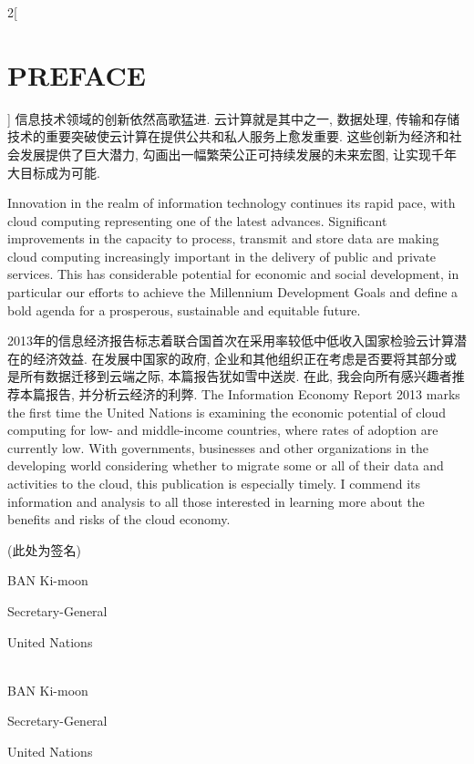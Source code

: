\documentclass[a4paper, UTF8, 12pt]{article}
\begin{document}
\begin{paracol}{2}[\section{PREFACE}]
    \switchcolumn*
    信息技术领域的创新依然高歌猛进. 云计算就是其中之一, 数据处理, 传输和存储技术的重要突破使云计算在提供公共和私人服务上愈发重要. 这些创新为经济和社会发展提供了巨大潜力, 勾画出一幅繁荣公正可持续发展的未来宏图, 让实现千年大目标成为可能. 

    \switchcolumn   
    Innovation in the realm of information technology continues its rapid pace, with cloud computing representing one of the latest advances. Significant improvements in the capacity to process, transmit and store data are making cloud computing increasingly important in the delivery of public and private services. This has considerable potential for economic and social development, in particular our efforts to achieve the Millennium Development Goals and define a bold agenda for a prosperous, sustainable and equitable future. 

    \switchcolumn*
    2013年的信息经济报告标志着联合国首次在采用率较低中低收入国家检验云计算潜在的经济效益. 在发展中国家的政府, 企业和其他组织正在考虑是否要将其部分或是所有数据迁移到云端之际, 本篇报告犹如雪中送炭. 在此, 我会向所有感兴趣者推荐本篇报告, 并分析云经济的利弊.
    \switchcolumn
    The Information Economy Report 2013 marks the first time the United Nations is examining the economic potential of cloud computing for low- and middle-income countries, where rates of adoption are currently low. With governments, businesses and other organizations in the developing world considering whether to migrate some or all of their data and activities to the cloud, this publication is especially timely. I commend its information and analysis to all those interested in learning more about the benefits and risks of the cloud economy.
    \switchcolumn*
    
    \begin{center}
        (此处为签名)

        BAN Ki-moon 
        
        Secretary-General
        
        United Nations
    \end{center}
    \switchcolumn
    \begin{center}
        \hspace{10pt}\\
        BAN Ki-moon 
        
        Secretary-General
        
        United Nations
    \end{center}
    
\end{paracol}
\end{document}
